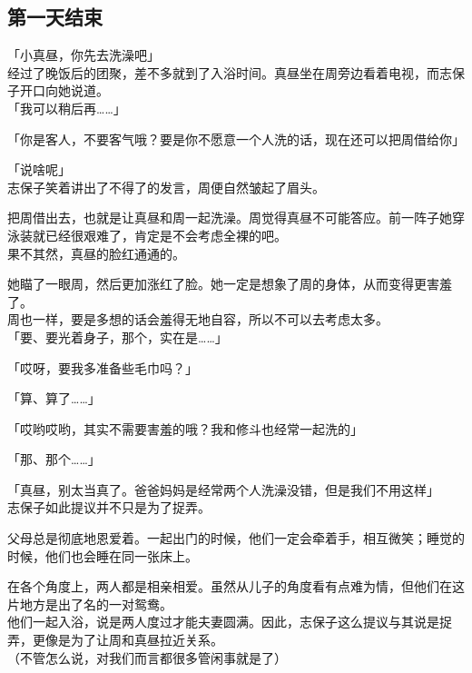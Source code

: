 \subsection{第一天结束}

「小真昼，你先去洗澡吧」\\

经过了晚饭后的团聚，差不多就到了入浴时间。真昼坐在周旁边看着电视，而志保子开口向她说道。\\

「我可以稍后再……」

「你是客人，不要客气哦？要是你不愿意一个人洗的话，现在还可以把周借给你」

「说啥呢」\\

志保子笑着讲出了不得了的发言，周便自然皱起了眉头。

把周借出去，也就是让真昼和周一起洗澡。周觉得真昼不可能答应。前一阵子她穿泳装就已经很艰难了，肯定是不会考虑全裸的吧。\\

果不其然，真昼的脸红通通的。

她瞄了一眼周，然后更加涨红了脸。她一定是想象了周的身体，从而变得更害羞了。\\

周也一样，要是多想的话会羞得无地自容，所以不可以去考虑太多。\\

「要、要光着身子，那个，实在是……」

「哎呀，要我多准备些毛巾吗？」

「算、算了……」

「哎哟哎哟，其实不需要害羞的哦？我和修斗也经常一起洗的」

「那、那个……」

「真昼，别太当真了。爸爸妈妈是经常两个人洗澡没错，但是我们不用这样」\\

志保子如此提议并不只是为了捉弄。

父母总是彻底地恩爱着。一起出门的时候，他们一定会牵着手，相互微笑；睡觉的时候，他们也会睡在同一张床上。

在各个角度上，两人都是相亲相爱。虽然从儿子的角度看有点难为情，但他们在这片地方是出了名的一对鸳鸯。\\

他们一起入浴，说是两人度过才能夫妻圆满。因此，志保子这么提议与其说是捉弄，更像是为了让周和真昼拉近关系。\\

（不管怎么说，对我们而言都很多管闲事就是了）\\


